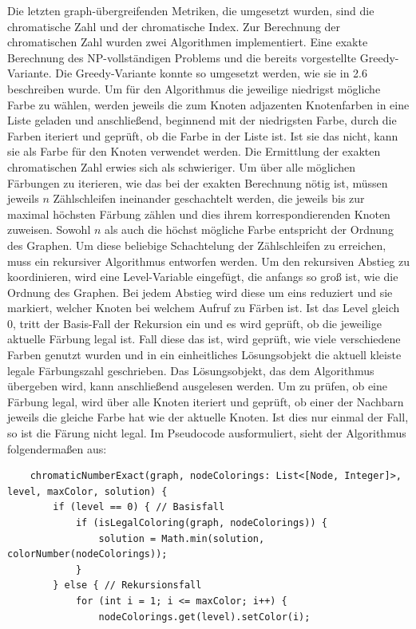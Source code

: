 \documentclass[a4paper,12pt,ngerman,chapterprefix=false,listof=totoc,bibliography=totoc]{scrreprt}
\begin{document}
{{{Die letzten graph-übergreifenden Metriken, die umgesetzt wurden, sind die chromatische Zahl und der chromatische Index. Zur Berechnung der chromatischen Zahl wurden zwei Algorithmen implementiert. Eine exakte Berechnung des NP-vollständigen Problems und die bereits vorgestellte Greedy-Variante. Die Greedy-Variante konnte so umgesetzt werden, wie sie in 2.6 beschreiben wurde. Um für den Algorithmus die jeweilige niedrigst mögliche Farbe zu wählen, werden jeweils die zum Knoten adjazenten Knotenfarben in eine Liste geladen und anschließend, beginnend mit der niedrigsten Farbe, durch die Farben iteriert und geprüft, ob die Farbe in der Liste ist. Ist sie das nicht, kann sie als Farbe für den Knoten verwendet werden. Die Ermittlung der exakten chromatischen Zahl erwies sich als schwieriger. Um über alle möglichen Färbungen zu iterieren, wie das bei der exakten Berechnung nötig ist, müssen jeweils \(n\) Zählschleifen ineinander geschachtelt werden, die jeweils bis zur maximal höchsten Färbung zählen und dies ihrem korrespondierenden Knoten zuweisen. Sowohl \(n\) als auch die höchst mögliche Farbe entspricht der Ordnung des Graphen. Um diese beliebige Schachtelung der Zählschleifen zu erreichen, muss ein rekursiver Algorithmus entworfen werden. Um den rekursiven Abstieg zu koordinieren, wird eine Level-Variable eingefügt, die anfangs so groß ist, wie die Ordnung des Graphen. Bei jedem Abstieg wird diese um eins reduziert und sie markiert, welcher Knoten bei welchem Aufruf zu Färben ist. Ist das Level gleich 0, tritt der Basis-Fall der Rekursion ein und es wird geprüft, ob die jeweilige aktuelle Färbung legal ist. Fall diese das ist, wird geprüft, wie viele verschiedene Farben genutzt wurden und in ein einheitliches Lösungsobjekt die aktuell kleiste legale Färbungszahl geschrieben. Das Lösungsobjekt, das dem Algorithmus übergeben wird, kann anschließend ausgelesen werden. Um zu prüfen, ob eine Färbung legal, wird über alle Knoten iteriert und geprüft, ob einer der Nachbarn jeweils die gleiche Farbe hat wie der aktuelle Knoten. Ist dies nur einmal der Fall, so ist die Färung nicht legal. Im Pseudocode ausformuliert, sieht der Algorithmus folgendermaßen aus:
\begin{lstlisting}
	chromaticNumberExact(graph, nodeColorings: List<[Node, Integer]>, level, maxColor, solution) {
		if (level == 0) { // Basisfall
			if (isLegalColoring(graph, nodeColorings)) {
				solution = Math.min(solution, colorNumber(nodeColorings));
			}
		} else { // Rekursionsfall
			for (int i = 1; i <= maxColor; i++) {
				nodeColorings.get(level).setColor(i);

\end{lstlisting}}}}
\end{document}
